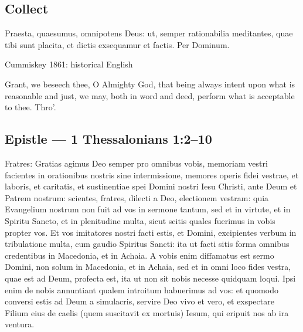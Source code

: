 \subsection{Collect}

\label{proper-collect}


\begin{latinproper}

Praesta, quaesumus, omnipotens Deus: ut, semper rationabilia meditantes, quae tibi sunt placita, et dictis exsequamur et factis. Per Dominum.

\end{latinproper}

\begin{englishwitness}{Cummiskey 1861: historical English}

Grant, we beseech thee, O Almighty God, that being always intent upon what is reasonable and just, we may, both in word and deed, perform what is acceptable to thee. Thro’.

\end{englishwitness}


\subsection{Epistle --- 1 Thessalonians 1:2–10}

\label{proper-epistle}


\begin{latinproper}

Fratres: Gratias agimus Deo semper pro omnibus vobis, memoriam vestri facientes in orationibus nostris sine intermissione, memores operis fidei vestrae, et laboris, et caritatis, et sustinentiae spei Domini nostri Iesu Christi, ante Deum et Patrem nostrum: scientes, fratres, dilecti a Deo, electionem vestram: quia Evangelium nostrum non fuit ad vos in sermone tantum, sed et in virtute, et in Spiritu Sancto, et in plenitudine multa, sicut scitis quales fuerimus in vobis propter vos. Et vos imitatores nostri facti estis, et Domini, excipientes verbum in tribulatione multa, cum gaudio Spiritus Sancti: ita ut facti sitis forma omnibus credentibus in Macedonia, et in Achaia. A vobis enim diffamatus est sermo Domini, non solum in Macedonia, et in Achaia, sed et in omni loco fides vestra, quae est ad Deum, profecta est, ita ut non sit nobis necesse quidquam loqui. Ipsi enim de nobis annuntiant qualem introitum habuerimus ad vos: et quomodo conversi estis ad Deum a simulacris, servire Deo vivo et vero, et exspectare Filium eius de caelis (quem suscitavit ex mortuis) Iesum, qui eripuit nos ab ira ventura.

\end{latinproper}

